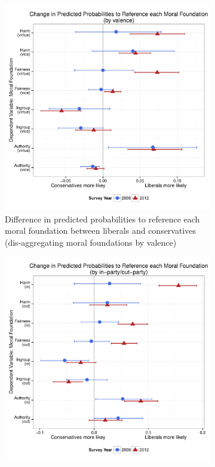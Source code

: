 \documentclass[12pt]{article}
\begin{document}
\begin{figure}[ht]
  \centering
  \caption{INSERT DESCRIPTION}
  \begin{subfigure}[t]{0.49\textwidth}
    \includegraphics[scale=.35]{../calc/fig/appD4val.pdf}
\caption{Difference in predicted probabilities to reference each moral foundation between liberals and conservatives (dis-aggregating moral foundations by valence)}\label{fig:appD4val}
  \end{subfigure}
  \begin{subfigure}[t]{0.49\textwidth}
    \includegraphics[scale=.35]{../calc/fig/appD5inout.pdf}

\end{subfigure}
\end{figure}
\end{document}
